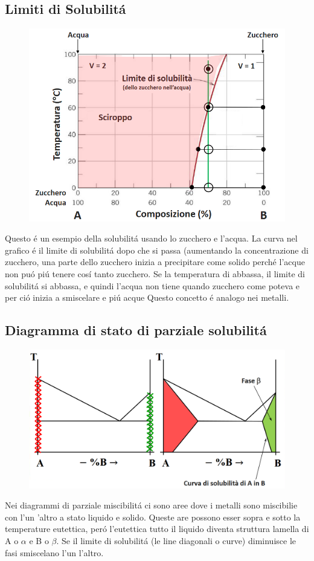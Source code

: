 \documentclass{article}
\begin{document}
{        \subsection{Limiti di Solubilit\'a}
            \begin{figure}[h!]
                \centering
                \includegraphics[width=.85\linewidth]{Esempio di Limite di Solubilita in un sistema acqua zucchero.png}
            \end{figure}
            Questo \'e un esempio della solubilit\'a usando lo zucchero e l'acqua. La curva nel grafico \'e il limite di solubilit\'a dopo che si passa (aumentando la concentrazione di zucchero, una parte dello zucchero inizia a precipitare come solido perch\'e l'acque non pu\'o pi\'u tenere cos\'i tanto zucchero. Se la temperatura di abbassa, il limite di solubilit\'a si abbassa, e quindi l'acqua non tiene quando zucchero come poteva e per ci\'o inizia a smiscelare e pi\'u acque  Questo concetto \'e analogo nei metalli.
        \subsection{Diagramma di stato di parziale solubilit\'a}
            \begin{figure}[h!]
                \centering
                \includegraphics[width=.85\linewidth]{Diagramma di stato di parziale solubilita esemplare.png}
            \end{figure}
            Nei diagrammi di parziale miscibilit\'a ci sono aree dove i metalli sono miscibilie con l'un 'altro a stato liquido e solido. Queste are possono esser sopra e sotto la temperature eutettica, per\'o l'eutettica tutto il liquido diventa struttura lamella di A o $\alpha$ e B o $\beta$. Se il limite di solubilit\'a (le line diagonali o curve) diminuisce le fasi smiscelano l'un l'altro.
        \newpage
}
\end{document}
